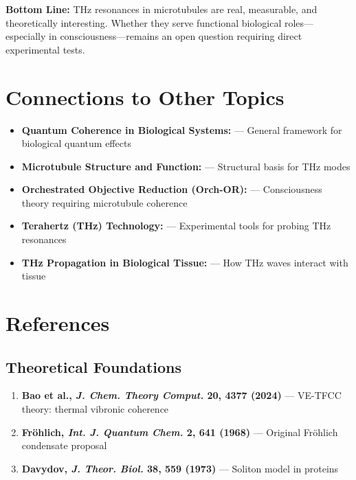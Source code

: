 \begin{itemize}
\begin{keyconcept}
\textbf{Bottom Line:} THz resonances in microtubules are real, measurable, and theoretically interesting. Whether they serve functional biological roles---especially in consciousness---remains an open question requiring direct experimental tests.
\end{keyconcept}

\section{Connections to Other Topics}\label{connections-to-other-wiki-pages}

\begin{itemize}

\item
  \textbf{Quantum Coherence in Biological Systems:} --- General
  framework for biological quantum effects
\item
  \textbf{Microtubule Structure and Function:} --- Structural
  basis for THz modes
\item
  \textbf{Orchestrated Objective Reduction (Orch-OR):} ---
  Consciousness theory requiring microtubule coherence
\item
  \textbf{Terahertz (THz) Technology:} --- Experimental tools for
  probing THz resonances
\item
  \textbf{THz Propagation in Biological Tissue:} --- How THz waves
  interact with tissue
\end{itemize}



\section{References}\label{references}

\subsection{Theoretical Foundations}\label{theoretical-foundations}

\begin{enumerate}
\def\labelenumi{\arabic{enumi}.}

\item
  \textbf{Bao et al., \emph{J. Chem. Theory Comput.} 20, 4377 (2024)}
  --- VE-TFCC theory: thermal vibronic coherence
\item
  \textbf{Fröhlich, \emph{Int. J. Quantum Chem.} 2, 641 (1968)} ---
  Original Fröhlich condensate proposal
\item
  \textbf{Davydov, \emph{J. Theor. Biol.} 38, 559 (1973)} ---
  Soliton model in proteins
\end{enumerate}


\end{itemize}
